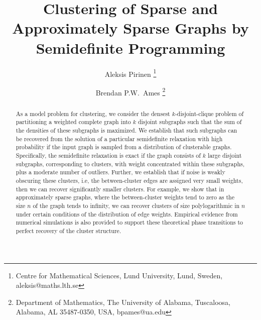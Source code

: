 \documentclass[twoside,11pt]{article}
\newcommand{\0}{\bs{0}}
\begin{document}
\title{Clustering of Sparse and Approximately Sparse Graphs by Semidefinite Programming}
\author{Aleksis Pirinen \thanks{Centre for Mathematical Sciences, Lund University, Lund, Sweden, aleksis@maths.lth.se  }
	\and
	 Brendan P.W.~Ames
	\thanks{ Department of Mathematics,
	The University of Alabama,
	Tuscaloosa, Alabama, AL 35487-0350, USA, bpames@ua.edu}
}

\maketitle
\begin{abstract}%
As a model problem for clustering, we consider the densest $k$-disjoint-clique problem of partitioning a weighted complete
graph into
$k$ disjoint subgraphs such that the sum of the densities of these subgraphs is maximized.
We establish that such subgraphs can be recovered from the solution of a particular
semidefinite relaxation with high probability if the input graph is sampled from a distribution of clusterable graphs.
Specifically, the semidefinite relaxation is exact if the graph 
consists of \(k\) large disjoint subgraphs, corresponding to clusters, with weight concentrated within these subgraphs,
plus a moderate number of outliers.
Further, we establish that if noise is weakly obscuring these clusters, i.e, the between-cluster edges are assigned
very small weights, 
then we can recover significantly smaller clusters. 
For example, we show that in approximately sparse graphs, where the between-cluster weights tend to zero as the size $n$ of the graph tends to infinity, we can recover clusters of size polylogarithmic in $n$
under certain conditions of the distribution of edge weights.
Empirical evidence from
numerical simulations is also provided to support these theoretical phase transitions to perfect recovery of the cluster structure.
\end{abstract}

\end{document}
